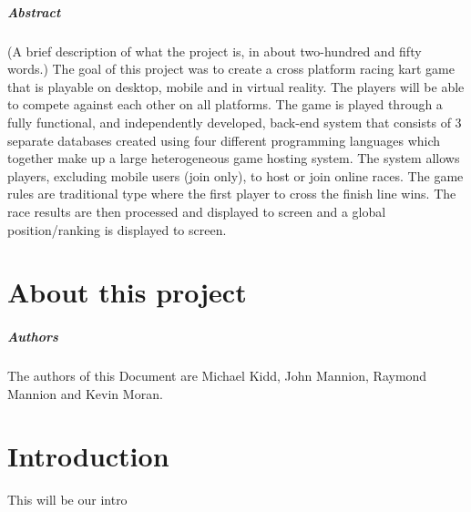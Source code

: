 
\paragraph{Abstract}
(A brief description of what the project is, in about two-hundred and fifty words.) 
The goal of this project was to create a cross platform racing kart game that is playable on desktop, mobile and in virtual reality. The players will be able to compete against each other on all platforms. The game is played through a fully functional, and independently developed, back-end system that consists of 3 separate databases created using four different programming languages which together make up a large heterogeneous game hosting system. The system allows players, excluding mobile users (join only), to host or join online races. The game rules are traditional type where the first player to cross the finish line wins. The race results are then processed and displayed to screen and a global position/ranking is displayed to screen.

\chapter*{About this project}

\paragraph{Authors}
The authors of this Document are Michael Kidd, John Mannion, Raymond Mannion and Kevin Moran.

\chapter{Introduction}
This will be our intro